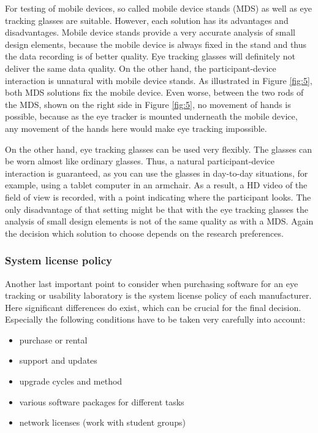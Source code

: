 \documentclass[output=paper]{langsci/langscibook}
\begin{document}
For testing of mobile devices, so called mobile device stands (MDS) as well as eye tracking glasses are suitable. However, each solution has its advantages and disadvantages. Mobile device stands provide a very accurate analysis of small design elements, because the mobile device is always fixed in the stand and thus the data recording is of better quality. Eye tracking glasses will definitely not deliver the same data quality. On the other hand, the participant-device interaction is unnatural with mobile device stands. As illustrated in Figure \ref{fig:5}, both MDS solutions fix the mobile device. Even worse, between the two rods of the MDS, shown on the right side in Figure \ref{fig:5}, no movement of hands is possible, because as the eye tracker is mounted underneath the mobile device, any movement of the hands here would make eye tracking impossible.


On the other hand, eye tracking glasses can be used very flexibly. The glasses can be worn almost like ordinary glasses. Thus, a natural participant-device interaction is guaranteed, as you can use the glasses in day-to-day situations, for example, using a tablet computer in an armchair. As a result, a HD video of the field of view is recorded, with a point indicating where the participant looks. The only disadvantage of that setting might be that with the eye tracking glasses the analysis of small design elements is not of the same quality as with a MDS. Again the decision which solution to choose depends on the research preferences.


\subsubsection{System license policy}

Another last important point to consider when purchasing software for an eye tracking or usability laboratory is the system license policy of each manufacturer. Here significant differences do exist, which can be crucial for the final decision. Especially the following conditions have to be taken very carefully into account:

\begin{itemize}
\item purchase or rental 
\item support and updates 
\item upgrade cycles and method 
\item various software packages for different tasks 
\item network licenses (work with student groups)
\end{itemize}
\end{document}
